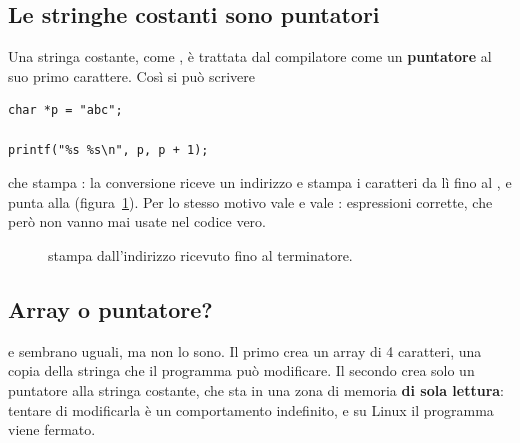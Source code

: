 \subsection{Le stringhe costanti sono puntatori}

Una stringa costante, come , è trattata dal compilatore come un
\textbf{puntatore} al suo primo carattere. Così si può scrivere

\begin{lstlisting}[style=c]
char *p = "abc";

printf("%s %s\n", p, p + 1);
\end{lstlisting}

che stampa : la conversione  riceve un indirizzo e
stampa i caratteri da lì fino al , e 
punta alla  (figura~\ref{fig:stringa-puntatore}). Per lo stesso motivo
 vale  e  vale :
espressioni corrette, che però non vanno mai usate nel codice vero.

\begin{figure}[H]
  \centering
  \caption{ stampa dall'indirizzo ricevuto fino al terminatore.}
  \label{fig:stringa-puntatore}
\end{figure}

\subsection{Array o puntatore?}

 e  sembrano uguali, ma non lo
sono. Il primo crea un array di 4 caratteri, una copia della stringa che il
programma può modificare. Il secondo crea solo un puntatore alla stringa
costante, che sta in una zona di memoria \textbf{di sola lettura}: tentare di
modificarla è un comportamento indefinito, e su Linux il programma viene
fermato.

